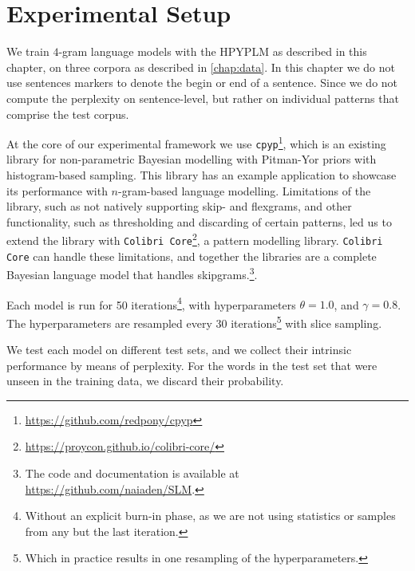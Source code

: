 \section{Experimental Setup}

We train $4$-gram language models with the HPYPLM as described in this chapter, on three corpora as described in \cref{chap:data}. In this chapter we do not use sentences markers to denote the begin or end of a sentence. Since we do not compute the perplexity on sentence-level, but rather on individual patterns that comprise the test corpus.

At the core of our experimental framework we use \texttt{cpyp}\footnote{\url{https://github.com/redpony/cpyp}}, which is an existing library for non-parametric Bayesian modelling with Pitman-Yor priors with histogram-based sampling\autocite{blunsom2009note}. This library has an example application to showcase its performance with $n$-gram-based language modelling. Limitations of the library, such as not natively supporting skip- and flexgrams, and other functionality, such as thresholding and discarding of certain patterns, led us to extend the library with \texttt{Colibri Core}\footnote{\url{https://proycon.github.io/colibri-core/}}, a pattern modelling library. \texttt{Colibri Core} can handle these limitations\autocite{gompel2016efficient}, and together the libraries are a complete Bayesian language model that handles skipgrams.\footnote{The code and documentation is available at \url{https://github.com/naiaden/SLM}.}.

Each model is run for 50 iterations\footnote{Without an explicit burn-in phase, as we are not using statistics or samples from any but the last iteration.}, with hyperparameters $\theta = 1.0$, and $\gamma = 0.8$. The hyperparameters are resampled every 30 iterations\footnote{Which in practice results in one resampling of the hyperparameters.} with slice sampling\autocite{walker2007sampling}.

We test each model on different test sets, and we collect their intrinsic performance by means of perplexity. For the words in the test set that were unseen in the training data, we discard their probability.

